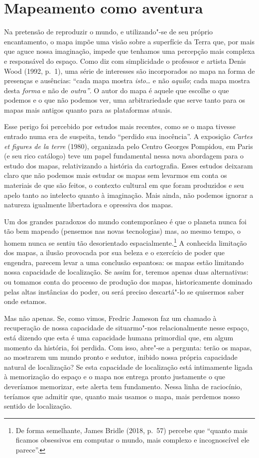 \chapter{Mapeamento como aventura}

Na pretensão de reproduzir o mundo, e utilizando"-se de seu próprio
encantamento, o mapa impõe uma visão sobre a superfície da Terra que,
por mais que aguce nossa imaginação, impede que tenhamos uma percepção
mais complexa e responsável do espaço. Como diz com simplicidade o
professor e artista Denis Wood (1992, p.~1), uma série de interesses são
incorporados ao mapa na forma de presenças e ausências: ``cada mapa
mostra \emph{isto}\ldots{} e não \emph{aquilo}; cada mapa mostra desta
\emph{forma} e não de \emph{outra''}. O autor do mapa é aquele que
escolhe o que podemos e o que não podemos ver, uma arbitrariedade que
serve tanto para os mapas mais antigos quanto para as plataformas
atuais.

Esse perigo foi percebido por estudos mais recentes, como se o mapa
tivesse entrado numa era de suspeita, tendo ``perdido sua inocência''. A
exposição \emph{Cartes et figures de la terre} (1980), organizada pelo
Centro Georges Pompidou, em Paris (e seu rico catálogo) teve um papel
fundamental nessa nova abordagem para o estudo dos mapas, relativizando
a história da cartografia. Esses estudos deixaram claro que não podemos
mais estudar os mapas sem levarmos em conta os materiais de que são
feitos, o contexto cultural em que foram produzidos e seu apelo tanto ao
intelecto quanto à imaginação. Mais ainda, não podemos ignorar a
natureza igualmente libertadora e opressiva dos mapas.

Um dos grandes paradoxos do mundo contemporâneo é que o planeta nunca
foi tão bem mapeado (pensemos nas novas tecnologias) mas, ao mesmo
tempo, o homem nunca se sentiu tão desorientado espacialmente.\footnote{De forma semelhante, James Bridle (2018, p.~57) percebe que ``quanto mais ficamos obsessivos em computar o mundo, mais complexo e incognoscível ele parece''.} A
conhecida limitação dos mapas, a ilusão provocada por sua beleza e o
exercício de poder que engendra, parecem levar a uma conclusão
espantosa: os mapas estão limitando nossa capacidade de localização. Se
assim for, teremos apenas duas alternativas: ou tomamos conta do
processo de produção dos mapas, historicamente dominado pelas altas
instâncias do poder, ou será preciso descartá"-lo se quisermos saber onde
estamos.

Mas não apenas. Se, como vimos, Fredric Jameson faz um chamado à
recuperação de nossa capacidade de situarmo"-nos relacionalmente nesse
espaço, está dizendo que esta é uma capacidade humana primordial que, em
algum momento da história, foi perdida. Com isso, abre"-se a pergunta:
terão os mapas, ao mostrarem um mundo pronto e sedutor, inibido nossa
própria capacidade natural de localização? Se esta capacidade de
localização está intimamente ligada à memorização do espaço e o mapa nos
entrega pronto justamente o que deveríamos memorizar, este alerta tem
fundamento. Nessa linha de raciocínio, teríamos que admitir que, quanto
mais usamos o mapa, mais perdemos nosso sentido de localização.

